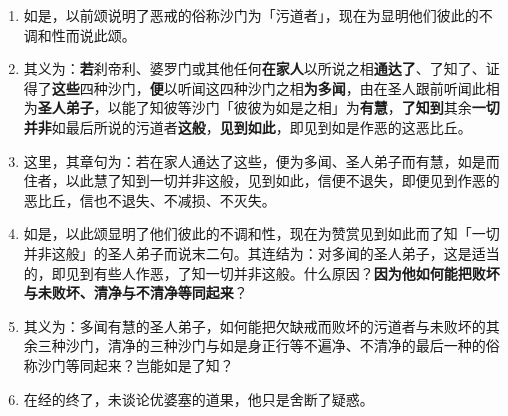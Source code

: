 \begin{enumerate}\item 如是，以前颂说明了恶戒的俗称沙门为「污道者」，现在为显明他们彼此的不调和性而说此颂。
\item 其义为：\textbf{若}刹帝利、婆罗门或其他任何\textbf{在家人}以所说之相\textbf{通达了}、了知了、证得了\textbf{这些}四种沙门，\textbf{便}以听闻这四种沙门之相\textbf{为多闻}，由在圣人跟前听闻此相为\textbf{圣人弟子}，以能了知彼等沙门「彼彼为如是之相」为\textbf{有慧}，\textbf{了知到}其余\textbf{一切并非}如最后所说的污道者\textbf{这般}，\textbf{见到如此}，即见到如是作恶的这恶比丘。
\item 这里，其章句为：若在家人通达了这些，便为多闻、圣人弟子而有慧，如是而住者，以此慧了知到一切并非这般，见到如此，信便不退失，即便见到作恶的恶比丘，信也不退失、不减损、不灭失。
\item 如是，以此颂显明了他们彼此的不调和性，现在为赞赏见到如此而了知「一切并非这般」的圣人弟子而说末二句。其连结为：对多闻的圣人弟子，这是适当的，即见到有些人作恶，了知一切并非这般。什么原因？\textbf{因为他如何能把败坏与未败坏、清净与不清净等同起来}？
\item 其义为：多闻有慧的圣人弟子，如何能把欠缺戒而败坏的污道者与未败坏的其余三种沙门，清净的三种沙门与如是身正行等不遍净、不清净的最后一种的俗称沙门等同起来？岂能如是了知？
\item 在经的终了，未谈论优婆塞的道果，他只是舍断了疑惑。\end{enumerate}

